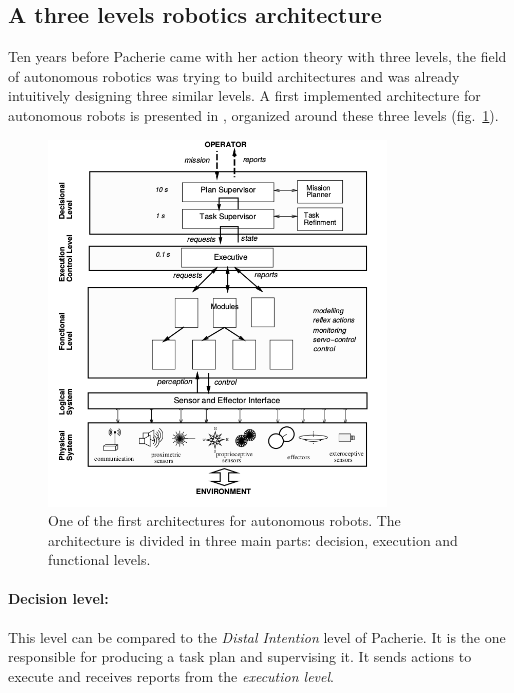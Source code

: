\documentclass[english,a4paper,11pt,twoside]{StyleThese}
\begin{document}
\subsection{A three levels robotics architecture}

\label{subsec:Archi}

Ten years before Pacherie came with her action theory with three levels, the field of autonomous robotics was trying to build architectures and was already intuitively designing three similar levels. A first implemented architecture for autonomous robots is presented in \cite{alami1998architecture}, organized around these three levels (fig.~\ref{fig:FirstArchi}).

\begin{figure}[!h]
	\centering
    \includegraphics[width=0.8\textwidth]{figs/Chapter1/ArchitectureHold.png}
    \caption{One of the first architectures for autonomous robots. The architecture is divided in three main parts: decision, execution and functional levels.}
    \label{fig:FirstArchi}
\end{figure}

\paragraph{Decision level:}
This level can be compared to the \textit{Distal Intention} level of Pacherie. It is the one responsible for producing a task plan and supervising it. It sends actions to execute and receives reports from the \textit{execution level}.
\end{document}
